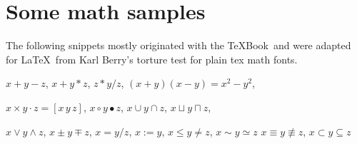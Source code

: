 \documentclass[11pt]{article}
\theoremstyle{oldplain}
\theoremstyle{plain}
\begin{document}
%
%

\newpage
\section*{Some math samples}
The following snippets mostly originated with the \TeX Book\ and were  adapted for \LaTeX\ from  Karl Berry's torture test for plain tex math fonts.

$x + y - z$, \quad $x + y * z$, \quad $z * y / z$, \quad 
$(x+y)(x-y) = x^2 - y^2$, 

$x \times y \cdot z = [x\, y\, z]$, \quad $x\circ y \bullet z$, \quad
$x\cup y \cap z$, \quad $x\sqcup y \sqcap z$, \quad

$x \vee y \wedge z$, \quad $x\pm y\mp z$, \quad
$x=y/z$, \quad $x:=y$, \quad $x\le y \ne z$, \quad $x \sim y \simeq z$
$x \equiv y \nequiv z$, \quad $x\subset y \subseteq z$
\end{document}
